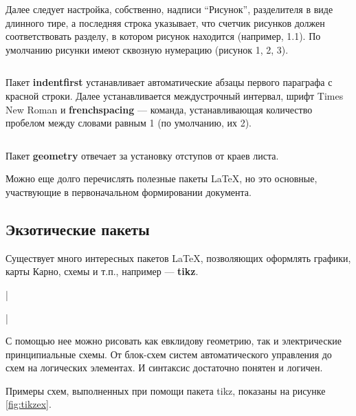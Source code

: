 Далее следует настройка, собственно, надписи ``Рисунок'', разделителя в виде длинного тире, а последняя строка указывает, что счетчик рисунков должен соответствовать разделу, в котором рисунок находится (например, 1.1). По умолчанию рисунки имеют сквозную нумерацию (рисунок 1, 2, 3).

\inputminted[breaklines,firstline=17,lastline=21,fontsize=\small]{latex}{../preamble.tex}

Пакет \textbf{indentfirst} устанавливает автоматические абзацы первого параграфа с красной строки. Далее устанавливается междустрочный интервал, шрифт Times New Roman и \textbf{frenchspacing} --- команда, устанавливающая количество пробелом между словами равным 1 (по умолчанию, их 2).

\inputminted[breaklines,firstline=23,lastline=27,fontsize=\small]{latex}{../preamble.tex}

Пакет \textbf{geometry} отвечает за установку отступов от краев листа.

Можно еще долго перечислять полезные пакеты \LaTeX, но это основные, участвующие в первоначальном формировании документа.

\subsection{Экзотические пакеты}
\label{sec:exotic}

Существует много интересных пакетов \LaTeX, позволяющих оформлять графики, карты Карно, схемы и т.п., например --- \textbf{tikz}.

|\usepackage{tikz}|

С помощью нее можно рисовать как евклидову геометрию, так и электрические принципиальные схемы. От блок-схем систем автоматического управления до схем на логических элементах. И синтаксис достаточно понятен и логичен.

Примеры схем, выполненных при помощи пакета tikz, показаны на рисунке \ref{fig:tikzex}.

